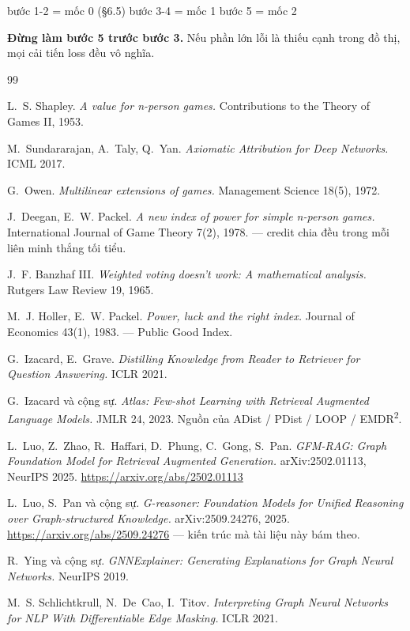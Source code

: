 \documentclass[11pt,a4paper]{article}
\begin{document}
\begin{dia}
bước 1-2  =  mốc 0  (§6.5)      bước 3-4  =  mốc 1      bước 5  =  mốc 2
\end{dia}

\textbf{Đừng làm bước 5 trước bước 3.} Nếu phần lớn lỗi là thiếu cạnh trong đồ thị, mọi cải tiến loss đều vô nghĩa.

\begin{thebibliography}{99}
\footnotesize

 L.~S. Shapley. \emph{A value for n-person games.}
Contributions to the Theory of Games II, 1953.

 M.~Sundararajan, A.~Taly, Q.~Yan. \emph{Axiomatic Attribution for Deep Networks.}
ICML 2017.

 G.~Owen. \emph{Multilinear extensions of games.}
Management Science 18(5), 1972.

 J.~Deegan, E.~W. Packel. \emph{A new index of power for simple
  n-person games.} International Journal of Game Theory 7(2), 1978. --- credit chia đều
  trong mỗi liên minh thắng tối tiểu.

 J.~F. Banzhaf III. \emph{Weighted voting doesn't work: A mathematical
  analysis.} Rutgers Law Review 19, 1965.

 M.~J. Holler, E.~W. Packel. \emph{Power, luck and the right index.}
  Journal of Economics 43(1), 1983. --- Public Good Index.

 G.~Izacard, E.~Grave. \emph{Distilling Knowledge from Reader to Retriever
for Question Answering.} ICLR 2021.

 G.~Izacard và cộng sự. \emph{Atlas: Few-shot Learning with Retrieval
Augmented Language Models.} JMLR 24, 2023. Nguồn của ADist / PDist / LOOP / EMDR\textsuperscript{2}.

 L.~Luo, Z.~Zhao, R.~Haffari, D.~Phung, C.~Gong, S.~Pan.
\emph{GFM-RAG: Graph Foundation Model for Retrieval Augmented Generation.}
arXiv:2502.01113, NeurIPS 2025. \url{https://arxiv.org/abs/2502.01113}

 L.~Luo, S.~Pan và cộng sự. \emph{G-reasoner: Foundation Models for
Unified Reasoning over Graph-structured Knowledge.} arXiv:2509.24276, 2025.
\url{https://arxiv.org/abs/2509.24276} --- kiến trúc mà tài liệu này bám theo.

 R.~Ying và cộng sự. \emph{GNNExplainer: Generating Explanations for Graph
Neural Networks.} NeurIPS 2019.

 M.~S. Schlichtkrull, N.~De~Cao, I.~Titov. \emph{Interpreting Graph Neural
Networks for NLP With Differentiable Edge Masking.} ICLR 2021.

\end{thebibliography}
\end{document}

